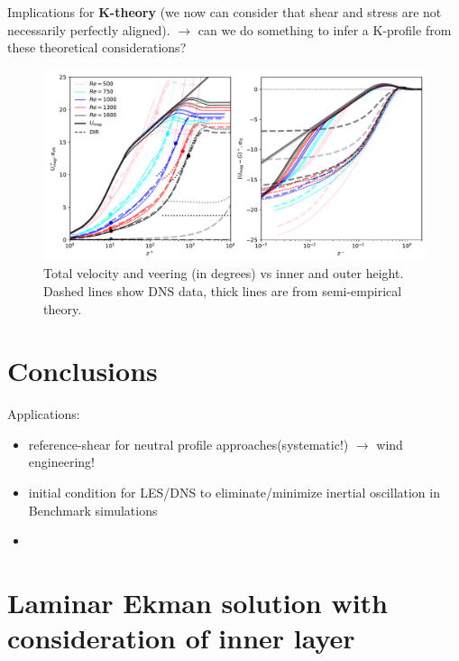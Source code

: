 \documentclass[smallcondensed,final]{svjour3}
\begin{document}
%
\par%
%
Implications for \textbf{K-theory} (we now can consider that shear and stress are not necessarily perfectly aligned).
$\rightarrow$ can we do something to infer a K-profile from these theoretical considerations? 
%
\begin{figure}
  \includegraphics[width=\textwidth]{../plot/mag_dir.pdf} 
  \caption{Total velocity and veering (in degrees) vs inner and outer height.
    Dashed lines show DNS data, thick lines are from semi-empirical theory.} 
\end{figure} 
%
\section{Conclusions}
%
Applications:
\begin{itemize}
\item reference-shear for neutral profile approaches(systematic!) $\rightarrow$ wind engineering! 
\item initial condition for LES/DNS to eliminate/minimize inertial oscillation in Benchmark simulations
\item
\end{itemize} 

 


\appendix

\section{Laminar Ekman solution with consideration of inner layer}
\label{app:ekman_solution}
\end{document}
